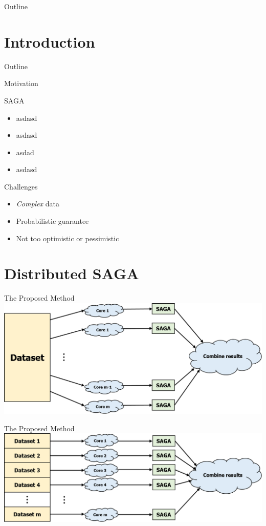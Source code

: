 \newcommand{\PP}{\mathbb{P}}
\newcommand{\EE}{\mathbb{E}}
\newcommand{\One}{\mathds{1}}
\makeatletter
\newcommand*{\rom}[1]{\expandafter\@slowromancap\romannumeral #1@}
\makeatother

\begin{frame}{Outline}
	\tableofcontents[hideallsubsections]
\end{frame}

\section{Introduction}

\begin{frame}{Outline}
\end{frame}
\begin{frame}{Motivation}
	\begin{block}{SAGA}
		\begin{itemize}
			\item asdasd
			\item asdasd
			\item asdad
			\item asdasd
		\end{itemize}
	\end{block}
	\pause
	\begin{block}{Challenges}
		\begin{itemize}
			\item \emph{Complex} data
			\item Probabilistic guarantee
			\item Not too optimistic or pessimistic
		\end{itemize}
	\end{block}
\end{frame}

\section{Distributed SAGA}

\begin{frame}{The Proposed Method}
	\centering
	\includegraphics[scale=0.35]{Picture1.PNG}
\end{frame}

\begin{frame}{The Proposed Method}
	\centering
	\includegraphics[scale=0.35]{Picture2.PNG}
\end{frame}

